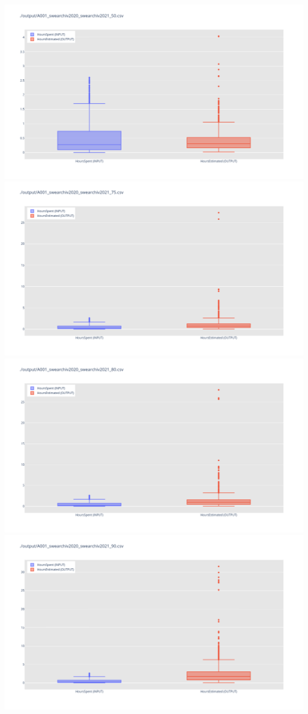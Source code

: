 \includegraphics[width=\textwidth]{Scripts/output/A001_swearchiv2020_swearchiv2021_50.csv.png}
\includegraphics[width=\textwidth]{Scripts/output/A001_swearchiv2020_swearchiv2021_75.csv.png}
\includegraphics[width=\textwidth]{Scripts/output/A001_swearchiv2020_swearchiv2021_80.csv.png}
\includegraphics[width=\textwidth]{Scripts/output/A001_swearchiv2020_swearchiv2021_90.csv.png}
